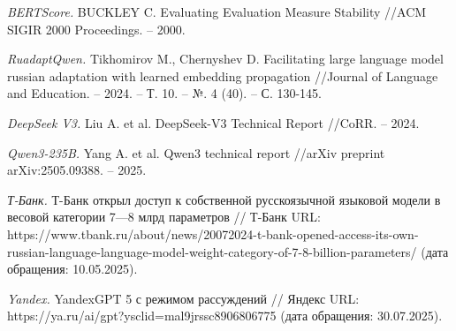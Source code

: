 \documentclass{article}
\begin{document}
\begin{thebibliography}{99}
\textit{BERTScore.}
BUCKLEY C. Evaluating Evaluation Measure Stability //ACM SIGIR 2000 Proceedings. – 2000.

\textit{RuadaptQwen.}
Tikhomirov M., Chernyshev D. Facilitating large language model russian adaptation with learned embedding propagation //Journal of Language and Education. – 2024. – Т. 10. – №. 4 (40). – С. 130-145.

\textit{DeepSeek V3.}
Liu A. et al. DeepSeek-V3 Technical Report //CoRR. – 2024.

\textit{Qwen3-235B.}
Yang A. et al. Qwen3 technical report //arXiv preprint arXiv:2505.09388. – 2025.

\textit{Т-Банк.}
Т-Банк открыл доступ к собственной русскоязычной языковой модели в весовой категории 7—8 млрд параметров 
// Т-Банк URL: https://www.tbank.ru/about/news/20072024-t-bank-opened-access-its-own-russian-language-language-model-weight-category-of-7-8-billion-parameters/ (дата обращения: 10.05.2025).

\textit{Yandex.}
YandexGPT 5 с режимом рассуждений // Яндекс URL: https://ya.ru/ai/gpt?ysclid=mal9jrssc8906806775 (дата обращения: 30.07.2025).
\end{thebibliography}
\end{document}
